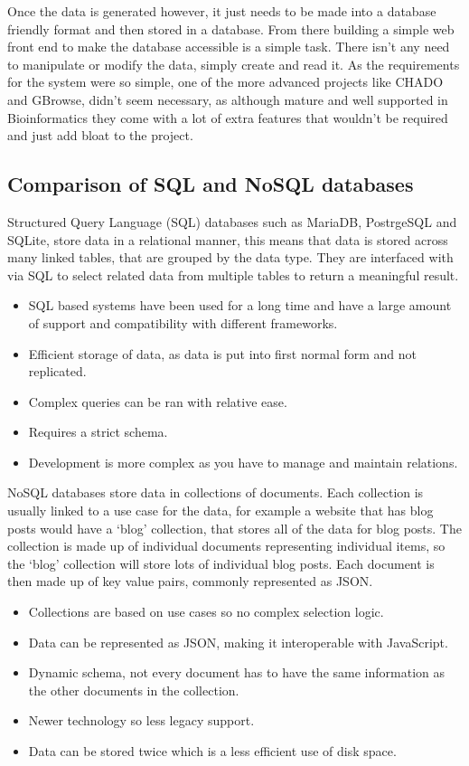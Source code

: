 Once the data is generated however, it just needs to be made into a database friendly format and then stored in a database. From there building a simple web front end to make the database accessible is a simple task. There isn't any need to manipulate or modify the data, simply create and read it. As the requirements for the system were so simple, one of the more advanced projects like CHADO and GBrowse, didn't seem necessary, as although mature and well supported in Bioinformatics they come with a lot of extra features that wouldn't be required and just add bloat to the project. 

  \subsection{Comparison of SQL and NoSQL databases}
  Structured Query Language (SQL) databases such as MariaDB, PostrgeSQL and SQLite, store data in a relational manner, this means that data is stored across many linked tables, that are grouped by the data type. They are interfaced with via SQL to select related data from multiple tables to return a meaningful result. 
  
  \begin{itemize}
    \item SQL based systems have been used for a long time and have a large amount of support and compatibility with different frameworks. 
    \item Efficient storage of data, as data is put into first normal form and not replicated.
    \item Complex queries can be ran with relative ease.
    \item Requires a strict schema.
    \item Development is more complex as you have to manage and maintain relations.
  \end{itemize}

  NoSQL databases store data in collections of documents. Each collection is usually linked to a use case for the data, for example a website that has blog posts would have a `blog' collection, that stores all of the data for blog posts. The collection is made up of individual documents representing individual items, so the `blog' collection will store lots of individual blog posts. Each document is then made up of key value pairs, commonly represented as JSON.\@

  \begin{itemize}
    \item Collections are based on use cases so no complex selection logic.
    \item Data can be represented as JSON, making it interoperable with JavaScript.
    \item Dynamic schema, not every document has to have the same information as the other documents in the collection.
    \item Newer technology so less legacy support.
    \item Data can be stored twice which is a less efficient use of disk space.
  \end{itemize}

